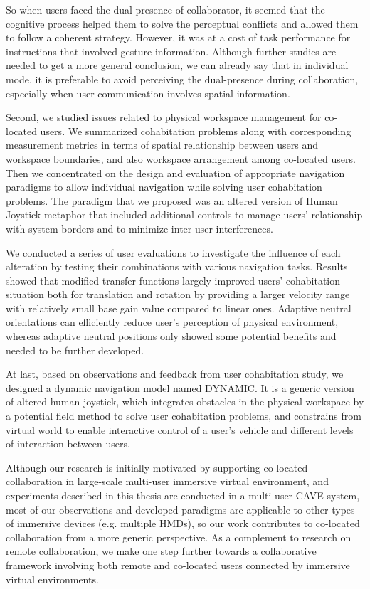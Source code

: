 So when users faced the dual-presence of collaborator, it seemed that the cognitive process helped them to solve the perceptual conflicts and allowed them to follow a coherent strategy. However, it was at a cost of task performance for instructions that involved gesture information. Although further studies are needed to get a more general conclusion, we can already say that in individual mode, it is preferable to avoid perceiving the dual-presence during collaboration, especially when user communication involves spatial information.

Second, we studied issues related to physical workspace management for co-located users. We summarized cohabitation problems along with corresponding measurement metrics in terms of spatial relationship between users and workspace boundaries, and also workspace arrangement among co-located users. Then we concentrated on the design and evaluation of appropriate navigation paradigms to allow individual navigation while solving user cohabitation problems. The paradigm that we proposed was an altered version of Human Joystick metaphor that included additional controls to manage users' relationship with system borders and to minimize inter-user interferences.

We conducted a series of user evaluations to investigate the influence of each alteration by testing their combinations with various navigation tasks. Results showed that modified transfer functions largely improved users' cohabitation situation both for translation and rotation by providing a larger velocity range with relatively small base gain value compared to linear ones. Adaptive neutral orientations can efficiently reduce user's perception of physical environment, whereas adaptive neutral positions only showed some potential benefits and needed to be further developed.

At last, based on observations and feedback from user cohabitation study, we designed a dynamic navigation model named DYNAMIC. It is a generic version of altered human joystick, which integrates obstacles in the physical workspace by a potential field method to solve user cohabitation problems, and constrains from virtual world to enable interactive control of a user's vehicle and different levels of interaction between users.

Although our research is initially motivated by supporting co-located collaboration in large-scale multi-user immersive virtual environment, and experiments described in this thesis are conducted in a multi-user CAVE system, most of our observations and developed paradigms are applicable to other types of immersive devices (e.g. multiple HMDs), so our work contributes to co-located collaboration from a more generic perspective. As a complement to research on remote collaboration, we make one step further towards a collaborative framework involving both remote and co-located users connected by immersive virtual environments.


